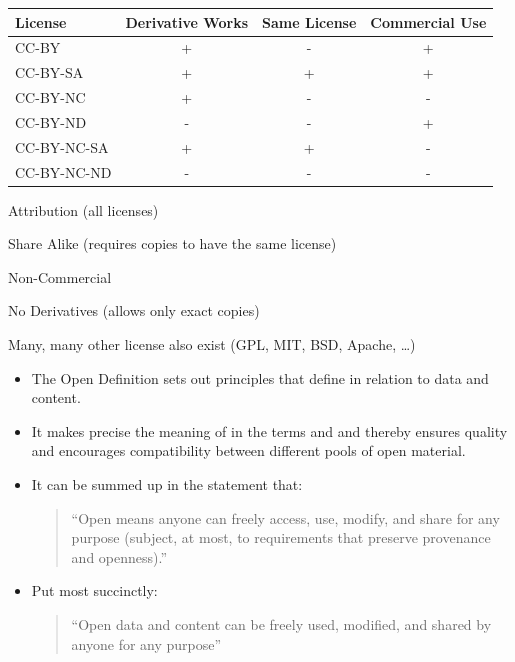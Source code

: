 \documentclass[a4paper,landscape,headrule,footrule,xetex]{foils}
\begin{document}
\medskip
\begin{tabular}{lccc}
  License       & Derivative Works & Same License & Commercial Use \\
\hline
  CC-BY         &   + &  - &  + \\
  CC-BY-SA      &   + &  + &  + \\  
  CC-BY-NC      &   + &  - &  - \\
  CC-BY-ND      &   - &  - &  + \\
  CC-BY-NC-SA   &   + &  + &  - \\
  CC-BY-NC-ND   &   - &  - &  - \\
\end{tabular}
\begin{description} \addtolength{\itemsep}{-0.5ex}
\item[BY] Attribution (all licenses)
\item[SA] Share Alike (requires copies to have the same license)
\item[NC] Non-Commercial 
\item[ND] No Derivatives (allows only exact copies) 
\end{description}

Many, many other license also exist (GPL, MIT, BSD, Apache, \ldots)

 \begin{itemize}
 \item The Open Definition sets out principles that define 
   in relation to data and content.
 \item It makes precise the meaning of  in the terms 
   and  and thereby ensures quality and encourages
   compatibility between different pools of open material.
 \item It can be summed up in the statement that:
   \begin{quote}
     “Open means anyone can freely access, use, modify, and share for
     any purpose (subject, at most, to requirements that preserve
     provenance and openness).”
   \end{quote}
 \item Put most succinctly:
   \begin{quote}
     “Open data and content can be freely used, modified, and shared
     by anyone for any purpose”
   \end{quote}
 \end{itemize}
\end{document}
